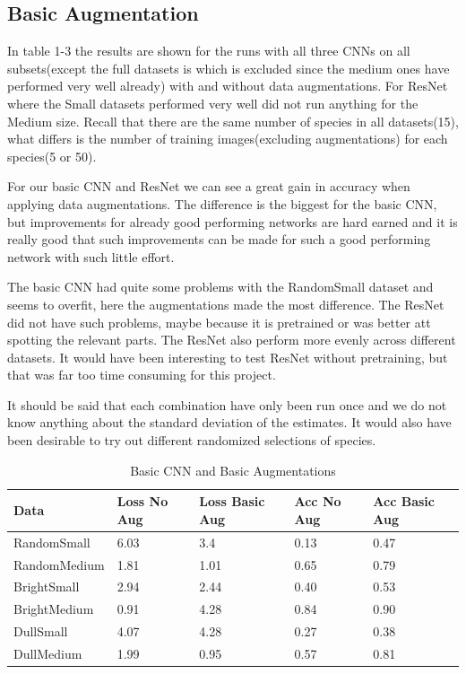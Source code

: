 \documentclass{article}
\begin{document}
\subsection{Basic Augmentation}
In table 1-3 the results are shown for the runs with all three CNNs on all subsets(except the full datasets is which is excluded since the medium ones have performed very well already) with and without data augmentations. For ResNet where the Small datasets performed very well did not run anything for the Medium size. Recall that there are the same number of species in all datasets(15), what differs is the number of training images(excluding augmentations) for each species(5 or 50).

For our basic CNN and ResNet we can see a great gain in accuracy when applying data augmentations. The difference is the biggest for the basic CNN, but improvements for already good performing networks are hard earned and it is really good that such improvements can be made for such a good performing network with such little effort. 

The basic CNN had quite some problems with the RandomSmall dataset and seems to overfit, here the augmentations made the most difference. The ResNet did not have such problems, maybe because it is pretrained or was better att spotting the relevant parts. The ResNet also perform more evenly across different datasets. It would have been interesting to test ResNet without pretraining, but that was far too time consuming for this project.

It should be said that each combination have only been run once and we do not know anything about the standard deviation of the estimates. It would also have been desirable to try out different randomized selections of species.

\begin{table}[H]
	\caption{Basic CNN and Basic Augmentations}
	\label{sample-table}
	\centering
	\begin{tabular}{lllll}
		\toprule
		Data & Loss No Aug & Loss Basic Aug & Acc No Aug& Acc Basic Aug \\
		\midrule
		RandomSmall  & 6.03 & 3.4 & 0.13 & 0.47 \\
		RandomMedium & 1.81 & 1.01& 0.65 & 0.79 \\
		BrightSmall  & 2.94 & 2.44& 0.40 & 0.53 \\
		BrightMedium & 0.91 & 4.28& 0.84 & 0.90 \\
		DullSmall    & 4.07 & 4.28& 0.27 & 0.38 \\
		DullMedium   & 1.99 & 0.95& 0.57 & 0.81\\
		\bottomrule
	\end{tabular}
\end{table}
\end{document}
